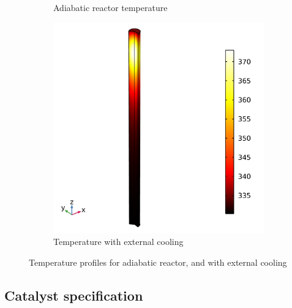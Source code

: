 \begin{figure}[h]
    \centering
    
    \begin{subfigure}{0.32\linewidth}
        \label{fig:Adiabatic-without-cooling}
        \caption{Adiabatic reactor temperature}
    \end{subfigure}
    \begin{subfigure}{0.32\linewidth}
        \includegraphics[width=\linewidth]{figures/simple-tube-temperature.png}
        \caption{Temperature with external cooling}
    \end{subfigure}
    


    \caption{Temperature profiles for adiabatic reactor, and with external cooling}
    \label{fig:simple-tube}
\end{figure}

\subsection{Catalyst specification}
